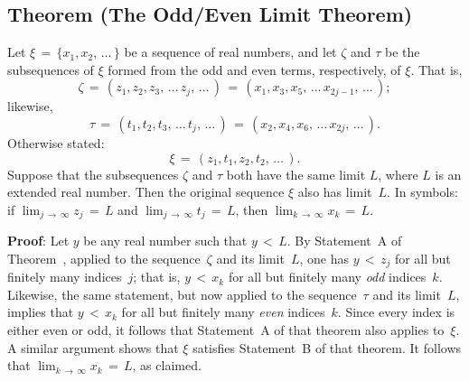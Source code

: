 \V

            \subsection{\small{\bf Theorem} (The Odd/Even Limit Theorem)}
            \label{ThmC20.90}

\V

        Let ${\xi} \,=\, \{x_{1},x_{2},\,{\ldots}\,\}$ be a sequence of real numbers, and let ${\zeta}$ and ${\tau}$ be the subsequences of ${\xi}$ formed from the odd and even terms, respectively, of ${\xi}$.
    That is,
        \begin{displaymath}
        {\zeta} \,=\, (z_{1},z_{2},z_{3},\,{\ldots}\,z_{j},\,{\ldots}\,) \,=\, (x_{1},x_{3},x_{5},\,{\ldots}\,x_{2j-1},\,{\ldots}\,);
        \end{displaymath}
    likewise,
        \begin{displaymath}
        {\tau} \,=\, (t_{1},t_{2},t_{3},\,{\ldots}\,t_{j},\,{\ldots}\,) \,=\, (x_{2},x_{4},x_{6},\,{\ldots}\,x_{2j},\,{\ldots}\,).
        \end{displaymath}
    Otherwise stated:
        \begin{displaymath}
        {\xi} \,=\, (z_{1},t_{1},z_{2},t_{2},\,{\ldots}\,).
        \end{displaymath}
    Suppose that the subsequences ${\zeta}$ and ${\tau}$ both have the same limit $L$, where $L$ is an extended real number.
    Then the original sequence ${\xi}$ also has limit~$L$. In symbols: if $\lim_{j \,{\rightarrow}\, {\infty}} z_{j} \,=\, L$
    and $\lim_{j \,{\rightarrow}\, {\infty}} t_{j} \,=\, L$, then $\lim_{k \,{\rightarrow}\, {\infty}} x_{k} \,=\, L$.

\V


\V

        {\bf Proof}: Let $y$ be any real number such that $y\,<\,L$.
    By Statement~A of Theorem~, applied to the sequence~${\zeta}$ and its limit~$L$, one has $y\,<\,z_{j}$ for all but finitely many indices~$j$;
    that is, $y\,<\,x_{k}$ for all but finitely many {\em odd} indices~$k$.
    Likewise, the same statement, but now applied to the sequence~${\tau}$ and its limit~$L$,
    implies that $y\,<\,x_{k}$ for all but finitely many {\em even} indices~$k$. Since every index is either even or odd,
    it follows that Statement~A of that theorem also applies to~${\xi}$. A similar argument shows that ${\xi}$ satisfies Statement~B of that theorem.  
    It follows that $\lim_{k \,{\rightarrow}\, {\infty}} x_{k} \,=\, L$, as claimed.

